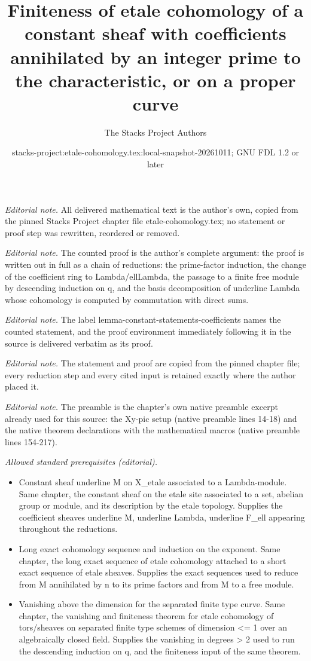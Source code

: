 \documentclass[10pt,a4paper]{amsart}
\title{Finiteness of etale cohomology of a constant sheaf with coefficients annihilated by an integer prime to the characteristic, or on a proper curve}
\author{The Stacks Project Authors}
\date{stacks-project:etale-cohomology.tex:local-snapshot-20261011; GNU FDL 1.2 or later}
\theoremstyle{plain}
\theoremstyle{definition}
\theoremstyle{remark}
\numberwithin{equation}{subsection}
\begin{document}
\maketitle
\noindent\textit{Editorial note.} All delivered mathematical text is the author's own, copied from the pinned Stacks Project chapter file etale-cohomology.tex; no statement or proof step was rewritten, reordered or removed.\par\medskip
\noindent\textit{Editorial note.} The counted proof is the author's complete argument: the proof is written out in full as a chain of reductions: the prime-factor induction, the change of the coefficient ring to Lambda/ellLambda, the passage to a finite free module by descending induction on q, and the basis decomposition of underline Lambda whose cohomology is computed by commutation with direct sums.\par\medskip
\noindent\textit{Editorial note.} The label lemma-constant-statements-coefficients names the counted statement, and the proof environment immediately following it in the source is delivered verbatim as its proof.\par\medskip
\noindent\textit{Editorial note.} The statement and proof are copied from the pinned chapter file; every reduction step and every cited input is retained exactly where the author placed it.\par\medskip
\noindent\textit{Editorial note.} The preamble is the chapter's own native preamble excerpt already used for this source: the Xy-pic setup (native preamble lines 14-18) and the native theorem declarations with the mathematical macros (native preamble lines 154-217).\par\medskip
\noindent\textit{Allowed standard prerequisites (editorial).}\begin{itemize}
\item Constant sheaf underline M on X\_etale associated to a Lambda-module. Same chapter, the constant sheaf on the etale site associated to a set, abelian group or module, and its description by the etale topology. Supplies the coefficient sheaves underline M, underline Lambda, underline F\_ell appearing throughout the reductions.
\item Long exact cohomology sequence and induction on the exponent. Same chapter, the long exact sequence of etale cohomology attached to a short exact sequence of etale sheaves. Supplies the exact sequences used to reduce from M annihilated by n to its prime factors and from M to a free module.
\item Vanishing above the dimension for the separated finite type curve. Same chapter, the vanishing and finiteness theorem for etale cohomology of tors/sheaves on separated finite type schemes of dimension <= 1 over an algebraically closed field. Supplies the vanishing in degrees > 2 used to run the descending induction on q, and the finiteness input of the same theorem.
\end{itemize}\medskip
\end{document}
